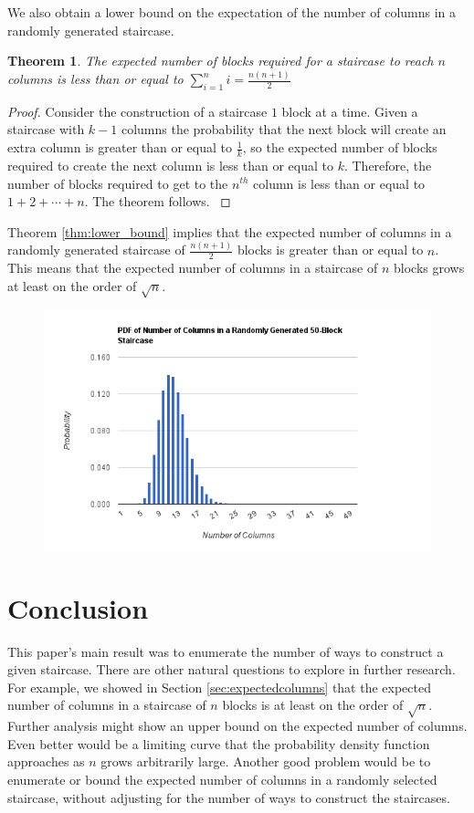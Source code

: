\documentclass[12pt]{amsart}
\newtheorem{theorem}{Theorem}[section]
\newcommand{\newsection}[2]{
\section{#1 \label{#2}}
}
\begin{document}
We also obtain a lower bound on the expectation of the number of columns in a randomly generated staircase.

\begin{theorem}
\label{lower_bound}
The expected number of blocks required for a staircase to reach $n$ columns is less than or equal to $\displaystyle\sum_{i=1}^{n}i = \frac{n(n+1)}{2}$
\end{theorem}

\begin{proof}
Consider the construction of a staircase $1$ block at a time. Given a staircase with $k-1$ columns the probability that the next block will create an extra column is greater than or equal to $\frac{1}{k}$, so the expected number of blocks required to create the next column is less than or equal to $k$. Therefore, the number of blocks required to get to the $n^{th}$ column is less than or equal to $1 + 2 + \cdots + n$. The theorem follows.
\label{thm:lower_bound}
\end{proof}

Theorem \ref{thm:lower_bound} implies that the expected number of columns in a randomly generated staircase of $\frac{n(n+1)}{2}$ blocks is greater than or equal to $n$. This means that the expected number of columns in a staircase of $n$ blocks grows at least on the order of $\sqrt{n}$.





\begin{figure}
\label{fig:prob_distribution}
\includegraphics[scale=.75]{column_prob_chart.png}
\end{figure}
  
\newsection{Conclusion}{sec:conclusion}

This paper's main result was to enumerate the number of ways to construct a given staircase. There are other natural questions to explore in further research. For example, we showed in Section \ref{sec:expectedcolumns} that the expected number of columns in a staircase of $n$ blocks is at least on the order of $\sqrt{n}$. Further analysis might show an upper bound on the expected number of columns. Even better would be a limiting curve that the probability density function approaches as $n$ grows arbitrarily large. Another good problem would be to enumerate or bound the expected number of columns in a randomly selected staircase, without adjusting for the number of ways to construct the staircases.
\end{document}
